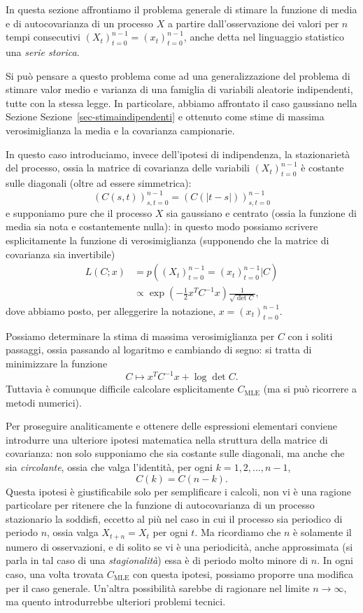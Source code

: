 \documentclass[
  italian,
  letterpaper,
]{book}
\newcommand{\bra}[1]{\left( #1 \right)}
\newcommand{\mle}{\operatorname{MLE}}
\theoremstyle{definition}
\theoremstyle{remark}
\begin{document}
In questa sezione affrontiamo il problema generale di stimare la
funzione di media e di autocovarianza di un processo \(X\) a partire
dall'osservazione dei valori per \(n\) tempi consecutivi
\((X_t)_{t=0}^{n-1} = (x_t)_{t=0}^{n-1}\), anche detta nel linguaggio
statistico una \emph{serie storica}.

Si può pensare a questo problema come ad una generalizzazione del
problema di stimare valor medio e varianza di una famiglia di variabili
aleatorie indipendenti, tutte con la stessa legge. In particolare,
abbiamo affrontato il caso gaussiano nella Sezione
Sezione~\ref{sec-stimaindipendenti} e ottenuto come stime di massima
verosimiglianza la media e la covarianza campionarie.

In questo caso introduciamo, invece dell'ipotesi di indipendenza, la
stazionarietà del processo, ossia la matrice di covarianza delle
variabili \((X_t)_{t =0}^{n-1}\) è costante sulle diagonali (oltre ad
essere simmetrica):
\[ (C(s,t))_{s,t=0}^{n-1} = (C(|t-s|))_{s,t=0}^{n-1}\] e supponiamo pure
che il processo \(X\) sia gaussiano e centrato (ossia la funzione di
media sia nota e costantemente nulla): in questo modo possiamo scrivere
esplicitamente la funzione di verosimiglianza (supponendo che la matrice
di covarianza sia invertibile)
\[\begin{split} L( C ; x) & = p((X_t)_{t=0}^{n-1} = (x_t)_{t=0}^{n-1} |  C) \\
& \propto \exp\bra{ - \frac 1 2 x^T C^{-1} x} \frac{1}{\sqrt{ \det C }},\end{split}\]
dove abbiamo posto, per alleggerire la notazione,
\(x = (x_t)_{t=0}^{n-1}\).

Possiamo determinare la stima di massima verosimiglianza per \(C\) con i
soliti passaggi, ossia passando al logaritmo e cambiando di segno: si
tratta di minimizzare la funzione
\[ C \mapsto x^T C^{-1} x + \log \det C.\] Tuttavia è comunque difficile
calcolare esplicitamente \(C_{\mle}\) (ma si può ricorrere a metodi
numerici).

Per proseguire analiticamente e ottenere delle espressioni elementari
conviene introdurre una ulteriore ipotesi matematica nella struttura
della matrice di covarianza: non solo supponiamo che sia costante sulle
diagonali, ma anche che sia \emph{circolante}, ossia che valga
l'identità, per ogni \(k =1,2,\ldots, n-1\), \[ C(k) = C(n-k).\] Questa
ipotesi è giustificabile solo per semplificare i calcoli, non vi è una
ragione particolare per ritenere che la funzione di autocovarianza di un
processo stazionario la soddisfi, eccetto al più nel caso in cui il
processo sia periodico di periodo \(n\), ossia valga \(X_{t+n} = X_t\)
per ogni \(t\). Ma ricordiamo che \(n\) è solamente il numero di
osservazioni, e di solito se vi è una periodicità, anche approssimata
(si parla in tal caso di una \emph{stagionalità}) essa è di periodo
molto minore di \(n\). In ogni caso, una volta trovata \(C_{\mle}\) con
questa ipotesi, possiamo proporre una modifica per il caso generale.
Un'altra possibilità sarebbe di ragionare nel limite \(n \to \infty\),
ma quento introdurrebbe ulteriori problemi tecnici.
\end{document}
